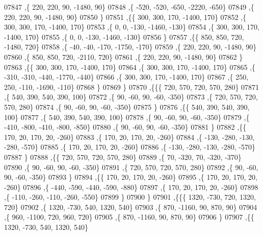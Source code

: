 \begin{DoxyCode}
07847     ,\{   220,   220,    90, -1480,    90\}
07848     ,\{  -520,  -520,  -650, -2220,  -650\}
07849     ,\{   220,   220,    90, -1480,    90\}
07850     \}
07851    ,\{\{   300,   300,   170, -1400,   170\}
07852     ,\{   300,   300,   170, -1400,   170\}
07853     ,\{     0,     0,  -130, -1460,  -130\}
07854     ,\{   300,   300,   170, -1400,   170\}
07855     ,\{     0,     0,  -130, -1460,  -130\}
07856     \}
07857    ,\{\{   850,   850,   720, -1480,   720\}
07858     ,\{   -40,   -40,  -170, -1750,  -170\}
07859     ,\{   220,   220,    90, -1480,    90\}
07860     ,\{   850,   850,   720, -2110,   720\}
07861     ,\{   220,   220,    90, -1480,    90\}
07862     \}
07863    ,\{\{   300,   300,   170, -1400,   170\}
07864     ,\{   300,   300,   170, -1400,   170\}
07865     ,\{  -310,  -310,  -440, -1770,  -440\}
07866     ,\{   300,   300,   170, -1400,   170\}
07867     ,\{   250,   250,  -110, -1690,  -110\}
07868     \}
07869    \}
07870   ,\{\{\{   720,   570,   720,   570,   280\}
07871     ,\{   540,   390,   540,   390,   100\}
07872     ,\{    90,   -60,    90,   -60,  -350\}
07873     ,\{   720,   570,   720,   570,   280\}
07874     ,\{    90,   -60,    90,   -60,  -350\}
07875     \}
07876    ,\{\{   540,   390,   540,   390,   100\}
07877     ,\{   540,   390,   540,   390,   100\}
07878     ,\{    90,   -60,    90,   -60,  -350\}
07879     ,\{  -410,  -800,  -410,  -800,  -850\}
07880     ,\{    90,   -60,    90,   -60,  -350\}
07881     \}
07882    ,\{\{   170,    20,   170,    20,  -260\}
07883     ,\{   170,    20,   170,    20,  -260\}
07884     ,\{  -130,  -280,  -130,  -280,  -570\}
07885     ,\{   170,    20,   170,    20,  -260\}
07886     ,\{  -130,  -280,  -130,  -280,  -570\}
07887     \}
07888    ,\{\{   720,   570,   720,   570,   280\}
07889     ,\{    70,  -320,    70,  -320,  -370\}
07890     ,\{    90,   -60,    90,   -60,  -350\}
07891     ,\{   720,   570,   720,   570,   280\}
07892     ,\{    90,   -60,    90,   -60,  -350\}
07893     \}
07894    ,\{\{   170,    20,   170,    20,  -260\}
07895     ,\{   170,    20,   170,    20,  -260\}
07896     ,\{  -440,  -590,  -440,  -590,  -880\}
07897     ,\{   170,    20,   170,    20,  -260\}
07898     ,\{  -110,  -260,  -110,  -260,  -550\}
07899     \}
07900    \}
07901   ,\{\{\{  1320,  -730,   720,  1320,   720\}
07902     ,\{  1320,  -730,   540,  1320,   540\}
07903     ,\{   870, -1160,    90,   870,    90\}
07904     ,\{   960, -1100,   720,   960,   720\}
07905     ,\{   870, -1160,    90,   870,    90\}
07906     \}
07907    ,\{\{  1320,  -730,   540,  1320,   540\}

\end{DoxyCode}

